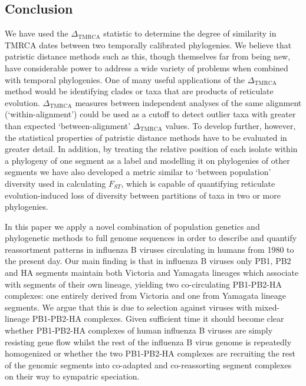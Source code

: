 \documentclass[11pt,oneside,letterpaper]{article}
\newcommand{\dtmrca}{\Delta_\mathrm{TMRCA}}
\begin{document}
\subsection*{Conclusion}
We have used the $\dtmrca$ statistic to determine the degree of similarity in TMRCA dates between two temporally calibrated phylogenies.
We believe that patristic distance methods such as this, though themselves far from being new, have considerable power to address a wide variety of problems when combined with temporal phylogenies.
One of many useful applications of the $\dtmrca$ method would be identifying clades or taxa that are products of reticulate evolution.
$\dtmrca$ measures between independent analyses of the same alignment (`within-alignment') could be used as a cutoff to detect outlier taxa with greater than expected `between-alignment' $\dtmrca$ values.
To develop further, however, the statistical properties of patristic distance methods have to be evaluated in greater detail.
In addition, by treating the relative position of each isolate within a phylogeny of one segment as a label and modelling it on phylogenies of other segments we have also developed a metric similar to `between population' diversity used in calculating $F_{ST}$, which is capable of quantifying reticulate evolution-induced loss of diversity between partitions of taxa in two or more phylogenies.

In this paper we apply a novel combination of population genetics and phylogenetic methods to full genome sequences in order to describe and quantify reassortment patterns in influenza B viruses circulating in humans from 1980 to the present day.
Our main finding is that in influenza B viruses only PB1, PB2 and HA segments maintain both Victoria and Yamagata lineages which associate with segments of their own lineage, yielding two co-circulating PB1-PB2-HA complexes: one entirely derived from Victoria and one from Yamagata lineage segments.
We argue that this is due to selection against viruses with mixed-lineage PB1-PB2-HA complexes.
Given sufficient time it should become clear whether PB1-PB2-HA complexes of human influenza B viruses are simply resisting gene flow whilst the rest of the influenza B virus genome is repeatedly homogenized or whether the two PB1-PB2-HA complexes are recruiting the rest of the genomic segments into co-adapted and co-reassorting segment complexes on their way to sympatric speciation.

\newpage
\end{document}
